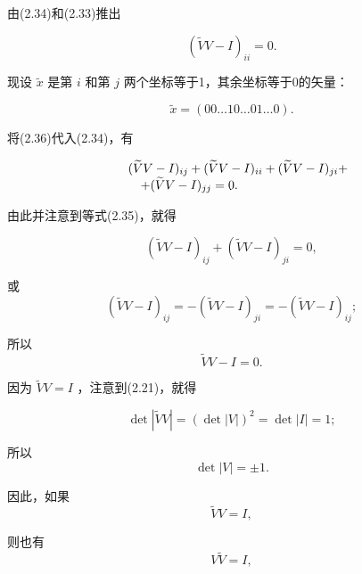 由(2.34)和(2.33)推出

\begin{equation*}
(\widetilde {V} V - I) _ {i i} = 0.\tag{2.35}
\end{equation*}

现设 $\widetilde{x}$ 是第 $i$ 和第 $j$ 两个坐标等于1，其余坐标等于0的矢量：

\begin{equation*}
\widetilde {x} = (0 0 \dots 1 0 \dots 0 1 \dots 0).\tag{2.36}
\end{equation*}

将(2.36)代入(2.34)，有

\begin{equation*}
\begin{array}{r l} & (\widetilde {V} V - I) _ {i j} + (\widetilde {V} V - I) _ {i i} + (\widetilde {V} V - I) _ {j i} + \\ & \quad + (\widetilde {V} V - I) _ {j j} = 0. \end{array}
\end{equation*}

由此并注意到等式(2.35)，就得

\begin{equation*}
(\widetilde {V} V - I) _ {i j} + (\widetilde {V} V - I) _ {j i} = 0,
\end{equation*}

或
\begin{equation*}
(\widetilde {V} V - I) _ {i j} = - (\widetilde {V} V - I) _ {j i} = - (\widetilde {V} V - I) _ {i j};
\end{equation*}

所以
\begin{equation*}
\widetilde {V} V - I = 0.
\end{equation*}

因为 $\widetilde{V} V = I$ ，注意到(2.21)，就得

\begin{equation*}
\det | \widetilde {V} V | = (\det | V |) ^ {2} = \det | I | = 1;
\end{equation*}

所以
\begin{equation*}
\det \left| V \right| = \pm 1.
\end{equation*}

因此，如果
\begin{equation*}
\widetilde {V} V = I,
\end{equation*}

则也有
\begin{equation*}
V \widetilde {V} = I,
\end{equation*}


